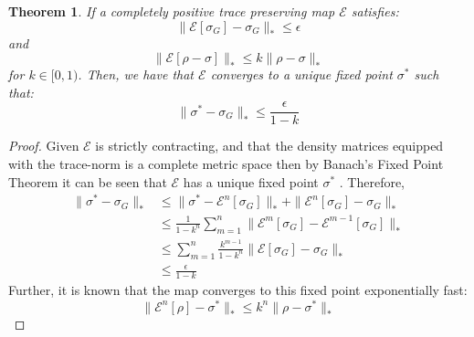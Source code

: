 \documentclass[aps,floatfix,10pt,amssymb,amsfont,amsmath,superscriptaddress,float,nofootinbib,longbibliography,nobalancelastpage,twocolumn]{revtex4-2}
\newtheorem{theorem}{Theorem}
\begin{document}
 \begin{theorem}
     If a completely positive trace preserving map $\mathcal{E}$ satisfies:
     \begin{equation}
         \|\mathcal{E}[\sigma_G] - \sigma_G\|_* \leq \epsilon
     \end{equation}
     and
 \begin{equation}
     \|\mathcal{E}[\rho-\sigma]\|_* \leq k\|\rho-\sigma\|_*
 \end{equation}
 for $k \in [0,1)$. Then, we have that $\mathcal{E}$ converges to a unique fixed point $\sigma^*$ such that:
 \begin{equation}
     \| \sigma^* -\sigma_G\|_* \leq \frac{\epsilon}{1-k}
 \end{equation}
 \label{theorem:error_bound}
 \end{theorem}
 \begin{proof}
     Given $\mathcal{E}$ is strictly contracting, and that the density matrices equipped with the trace-norm is a complete metric space then by Banach’s Fixed Point Theorem it can be seen that $\mathcal{E}$ has a unique fixed point $\sigma^*$ \cite{Mart_nez_Pe_a_2023,Raginsky_2002}.
Therefore,
\begin{align}
 \| \sigma^* -\sigma_G\|_* &\leq \|\sigma^*-\mathcal{E}^n[\sigma_G]\|_* +\|\mathcal{E}^n[\sigma_G] - \sigma_G\|_*\\
     &\leq \frac{1}{1-k^n}\sum_{m=1}^n \| \mathcal{E}^m[\sigma_G] - \mathcal{E}^{m-1}[\sigma_G]\|_*\\
    & \leq \sum_{m=1}^n\frac{k^{m-1}}{1-k^n} \| \mathcal{E}[\sigma_G] - \sigma_G\|_*\\
    &\leq \frac{\epsilon}{1-k}
\end{align}
Further, it is known that the map converges to this fixed point exponentially fast:
\begin{equation}
     \|\mathcal{E}^n[\rho] -\sigma^*\|_* \leq k^n\| \rho - \sigma^*\|_*
\end{equation}
 \end{proof}
\end{document}
